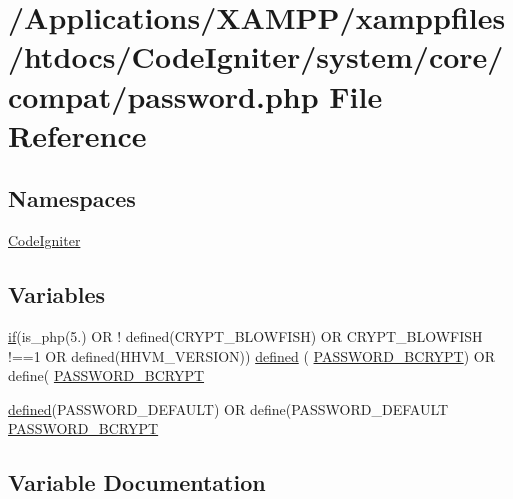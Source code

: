 \hypertarget{password_8php}{}\section{/\+Applications/\+X\+A\+M\+P\+P/xamppfiles/htdocs/\+Code\+Igniter/system/core/compat/password.php File Reference}
\label{password_8php}
\subsection*{Namespaces}
\begin{DoxyCompactItemize}
\item 
 \mbox{\hyperlink{namespace_code_igniter}{Code\+Igniter}}
\end{DoxyCompactItemize}
\subsection*{Variables}
\begin{DoxyCompactItemize}
\item 
\mbox{\hyperlink{_test_test_8php_a107bc088eea0dce8972b45c841f5ff9c}{if}}(is\+\_\+php(\textquotesingle{}5.\textquotesingle{}) OR ! defined(\textquotesingle{}C\+R\+Y\+P\+T\+\_\+\+B\+L\+O\+W\+F\+I\+SH\textquotesingle{}) OR C\+R\+Y\+P\+T\+\_\+\+B\+L\+O\+W\+F\+I\+SH !==1 OR defined(\textquotesingle{}H\+H\+V\+M\+\_\+\+V\+E\+R\+S\+I\+ON\textquotesingle{})) \mbox{\hyperlink{password_8php_a74f41c0efe4435fb8ac2133464d3cd57}{defined}} ( \textquotesingle{}\mbox{\hyperlink{password_8php_a68891a3748e6362ed60dd2dc90d37576}{P\+A\+S\+S\+W\+O\+R\+D\+\_\+\+B\+C\+R\+Y\+PT}}\textquotesingle{}) OR define( \textquotesingle{}\mbox{\hyperlink{password_8php_a68891a3748e6362ed60dd2dc90d37576}{P\+A\+S\+S\+W\+O\+R\+D\+\_\+\+B\+C\+R\+Y\+PT}}\textquotesingle{}
\item 
\mbox{\hyperlink{password_8php_a74f41c0efe4435fb8ac2133464d3cd57}{defined}}(\textquotesingle{}P\+A\+S\+S\+W\+O\+R\+D\+\_\+\+D\+E\+F\+A\+U\+LT\textquotesingle{}) OR define(\textquotesingle{}P\+A\+S\+S\+W\+O\+R\+D\+\_\+\+D\+E\+F\+A\+U\+LT\textquotesingle{} \mbox{\hyperlink{password_8php_a68891a3748e6362ed60dd2dc90d37576}{P\+A\+S\+S\+W\+O\+R\+D\+\_\+\+B\+C\+R\+Y\+PT}}
\end{DoxyCompactItemize}


\subsection{Variable Documentation}
\mbox{\label{password_8php_a74f41c0efe4435fb8ac2133464d3cd57}} 
